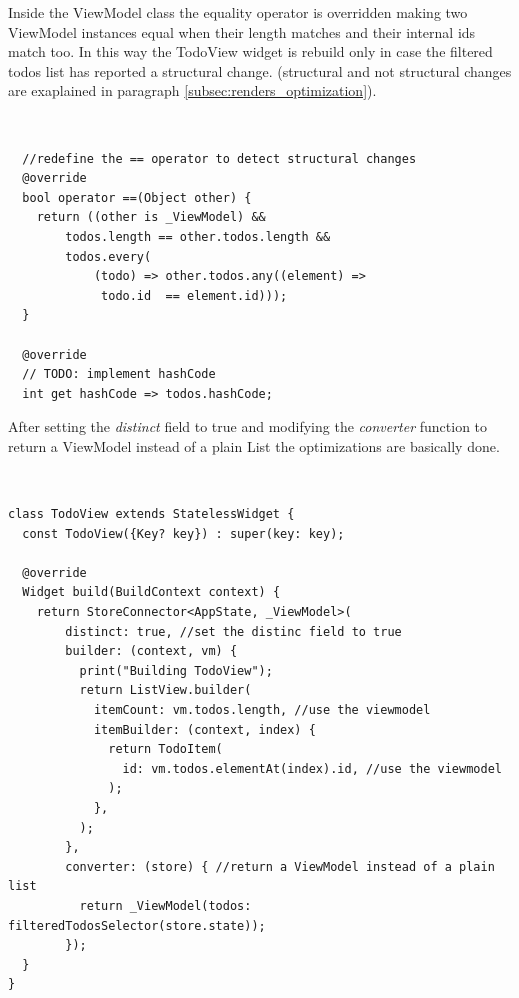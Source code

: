  Inside the ViewModel class the equality operator is overridden making two ViewModel instances equal when their length matches and their internal ids match too. In this way the TodoView widget is rebuild only in case the filtered todos list has reported a structural change. (structural and not structural changes are exaplained in paragraph \ref{subsec:renders_optimization}). 
\begin{code}
\mbox{}\\
 \mbox{}
		\label{code:2.14}
\begin{verbatim}
  //redefine the == operator to detect structural changes
  @override
  bool operator ==(Object other) {
    return ((other is _ViewModel) &&
        todos.length == other.todos.length &&
        todos.every(
            (todo) => other.todos.any((element) =>
             todo.id  == element.id)));
  }

  @override
  // TODO: implement hashCode
  int get hashCode => todos.hashCode;
\end{verbatim}
\mbox{}
\end{code}

After setting the \textit{distinct} field to true and modifying the \textit{converter} function to return a ViewModel instead of a plain List the optimizations are basically done.
\begin{code}
\mbox{}\\
 \mbox{}
		\label{code:2.14}
\begin{verbatim}
class TodoView extends StatelessWidget {
  const TodoView({Key? key}) : super(key: key);

  @override
  Widget build(BuildContext context) {
    return StoreConnector<AppState, _ViewModel>(
        distinct: true, //set the distinc field to true
        builder: (context, vm) {
          print("Building TodoView");
          return ListView.builder(
            itemCount: vm.todos.length, //use the viewmodel
            itemBuilder: (context, index) {
              return TodoItem(
                id: vm.todos.elementAt(index).id, //use the viewmodel
              );
            },
          );
        },
        converter: (store) { //return a ViewModel instead of a plain list
          return _ViewModel(todos: filteredTodosSelector(store.state));
        });
  }
}
\end{verbatim}
\mbox{}
\end{code}

